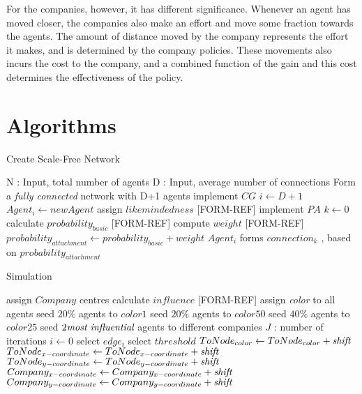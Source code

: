 For the companies, however, it has different significance. Whenever an agent has moved closer, the companies also make an effort and move some fraction towards the agents. The amount of distance moved by the company represents the effort it makes, and is determined by the company policies. These movements also incurs the cost to the company, and a combined function of the gain and this cost determines the effectiveness of the policy.





\section{Algorithms}

\begin{algorithm}
\caption{Create Scale-Free Network}
\label{ag1}
\begin{algorithmic}
\STATE N : Input, total number of agents
\STATE D : Input, average number of connections
	\STATE Form a \emph{fully connected} network with D+1 agents
\ENDIF 
\STATE implement $CG$
\STATE $i \gets D+1$
	\STATE $Agent_i \gets newAgent$
	\STATE assign $likemindedness$ [FORM-REF]
	\STATE implement $PA$
	\STATE $k \gets 0$
		\STATE calculate $probability_{basic}$ [FORM-REF]
		\STATE compute $weight$ [FORM-REF]
		\STATE $probability_{attachment} \gets  probability_{basic} + weight$ 
		\STATE $Agent_i$ forms $connection_k$ , based on $probability_{attachment}$
	\ENDWHILE	
\ENDWHILE
\end{algorithmic}
\end{algorithm}

\clearpage

\begin{algorithm}
\caption{Simulation}
\label{alg2}
\begin{algorithmic}
\STATE assign $Company$ centres
\STATE calculate $influence$ [FORM-REF]
\STATE assign \emph{color} to all agents
\STATE seed $20\% $ agents to $color1$
\STATE seed $20\%$ agents to $color50$
\STATE seed $40\%$ agents to $color25$
\STATE seed $2 \emph{most influential}$ agents to different companies
\STATE $J$ : number of iterations
\STATE $i \gets 0$
	\STATE select $edge_i$
		\STATE select $threshold$
			\STATE $ToNode_{color} \gets ToNode_{color} + \emph{shift}$
			\STATE $ToNode_{x-coordinate} \gets ToNode_{x-coordinate} + \emph{shift}$
			\STATE $ToNode_{y-coordinate} \gets ToNode_{y-coordinate} + \emph{shift}$
			\STATE $Company_{x-coordinate} \gets Company_{x-coordinate} + \emph{shift}$
			\STATE $Company_{y-coordinate} \gets Company_{y-coordinate} + \emph{shift}$
		\ENDIF
	\ENDIF
\ENDWHILE
\end{algorithmic}
\end{algorithm}

